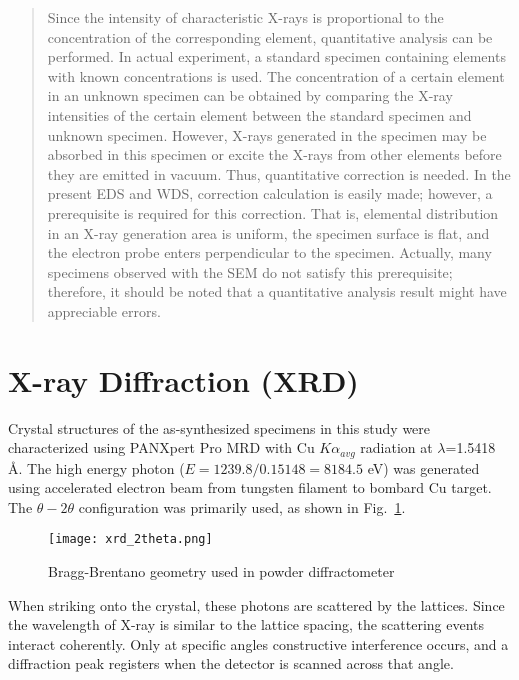 \begin{quotation}
Since the intensity of characteristic X-rays is proportional to the concentration of the corresponding element, quantitative analysis
can be performed. In actual experiment, a standard specimen containing elements with known concentrations is used. The
concentration of a certain element in an unknown specimen can be obtained by comparing the X-ray intensities of the certain element
between the standard specimen and unknown specimen. However, X-rays generated in the specimen may be absorbed in
this specimen or excite the X-rays from other elements before they are emitted in vacuum. Thus, quantitative correction is needed.
In the present EDS and WDS, correction calculation is easily made; however, a prerequisite is required for this correction. That is,
elemental distribution in an X-ray generation area is uniform, the specimen surface is flat, and the electron probe enters perpendicular to the specimen. Actually, many specimens observed with the SEM do not satisfy this prerequisite; therefore, it should be noted that a quantitative analysis result might have appreciable errors.
\end{quotation}


\fi

\section{X-ray Diffraction (XRD)}

Crystal structures of the as-synthesized specimens in this study were characterized using PANXpert Pro MRD with Cu $K\alpha_{avg}$ radiation at $\lambda$=1.5418 \AA. The high energy photon ($E = 1239.8/0.15148= 8184.5$ eV) was generated using accelerated electron beam from tungsten filament to bombard Cu target. The $\theta-2\theta$ configuration was primarily used, as shown in Fig.~\ref{fig:ch2theta}. 
\begin{figure}[htb]
\centering
\texttt{[image: xrd\_2theta.png]}

\caption[XRD configuration]{Bragg-Brentano geometry used in powder diffractometer}
\label{fig:ch2theta}
\end{figure}
When striking onto the crystal, these photons are scattered by the lattices. Since the wavelength of X-ray is similar to the lattice spacing, the scattering events interact coherently. Only at specific angles constructive interference occurs, and a diffraction peak registers when the detector is scanned across that angle.  

